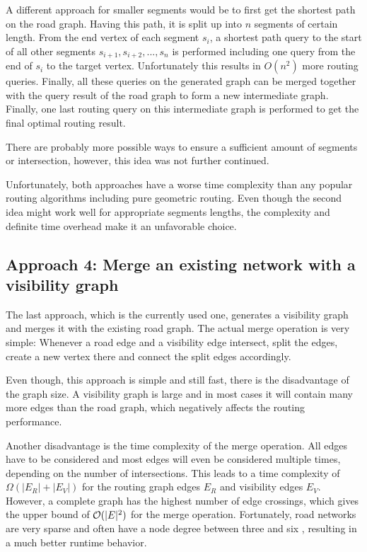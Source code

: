 		A different approach for smaller segments would be to first get the shortest path on the road graph.
		Having this path, it is split up into $n$ segments of certain length.
		From the end vertex of each segment $s_i$, a shortest path query to the start of all other segments $s_{i+1}, s_{i+2}, ..., s_n$ is performed including one query from the end of $s_i$ to the target vertex.
		Unfortunately this results in $O(n^2)$ more routing queries.
		Finally, all these queries on the generated graph can be merged together with the query result of the road graph to form a new intermediate graph.
		Finally, one last routing query on this intermediate graph is performed to get the final optimal routing result.
		
		There are probably more possible ways to ensure a sufficient amount of segments or intersection, however, this idea was not further continued.
		
		Unfortunately, both approaches have a worse time complexity than any popular routing algorithms including pure geometric routing.
		Even though the second idea might work well for appropriate segments lengths, the complexity and definite time overhead make it an unfavorable choice.
	
	\subsection{Approach 4: Merge an existing network with a visibility graph}
	
		The last approach, which is the currently used one, generates a visibility graph and merges it with the existing road graph.
		The actual merge operation is very simple:
		Whenever a road edge and a visibility edge intersect, split the edges, create a new vertex there and connect the split edges accordingly.
		
		Even though, this approach is simple and still fast, there is the disadvantage of the graph size.
		A visibility graph is large and in most cases it will contain many more edges than the road graph, which negatively affects the routing performance.
		
		Another disadvantage is the time complexity of the merge operation.
		All edges have to be considered and most edges will even be considered multiple times, depending on the number of intersections.
		This leads to a time complexity of $\Omega(|E_R| + |E_V|)$ for the routing graph edges $E_R$ and visibility edges $E_V$.
		However, a complete graph has the highest number of edge crossings, which gives the upper bound of $\mathcal{O}(|E|^2)$ for the merge operation.
		Fortunately, road networks are very sparse and often have a node degree between three and six \cite{zhao-analysis-osm-bejing}\cite{boeing-osmnx}, resulting in a much better runtime behavior.
		
